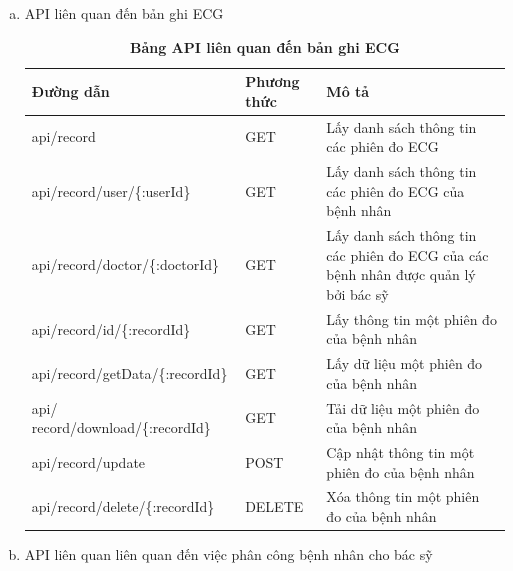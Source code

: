 \begin{enumerate}[a)]
\begin{table}[H]
\begin{tabularx}{0.9\textwidth}{
  | >{\raggedright\arraybackslash}X
  | >{\raggedright\arraybackslash}m{2cm}
  | >{\raggedright\arraybackslash}X|
  }
  \end{tabularx}
  \label{table_api_device}
\end{table}

\item API liên quan đến bản ghi ECG


\begin{table}[H]
  \centering
  \caption{\bfseries \fontsize{12pt}{0pt}\selectfont Bảng API liên quan đến bản ghi ECG}
  \begin{tabularx}{0.9\textwidth}{
  | >{\raggedright\arraybackslash}X
  | >{\raggedright\arraybackslash}m{2cm}
  | >{\raggedright\arraybackslash}X|
  }
  \hline
  \bfseries Đường dẫn    &\bfseries Phương thức    &\bfseries Mô tả\\ \hline
 api/record   &   GET  & Lấy danh sách thông tin các phiên đo ECG \\ \hline
 api/record/user/\{:userId\}   &    GET    & Lấy danh sách thông tin các phiên đo ECG của bệnh nhân \\ \hline
 api/record/doctor/\{:doctorId\} &   GET     & Lấy danh sách thông tin các phiên đo ECG của các bệnh nhân được quản lý bởi bác sỹ \\ \hline
 api/record/id/\{:recordId\}  &     GET   & Lấy thông tin một phiên đo của bệnh nhân \\ \hline
 api/record/getData/\{:recordId\}  &     GET   & Lấy dữ liệu một phiên đo của bệnh nhân \\ \hline
 api/ record/download/\{:recordId\}  &     GET   & Tải dữ liệu một phiên đo của bệnh nhân \\ \hline
 api/record/update  &     POST   & Cập nhật thông tin một phiên đo của bệnh nhân \\ \hline
 api/record/delete/\{:recordId\}  &     DELETE   & Xóa thông tin một phiên đo của bệnh nhân \\ \hline

  \end{tabularx}
  \label{table_api_ecg}
\end{table}


\item API liên quan liên quan đến việc phân công bệnh nhân cho bác sỹ


\end{enumerate}
